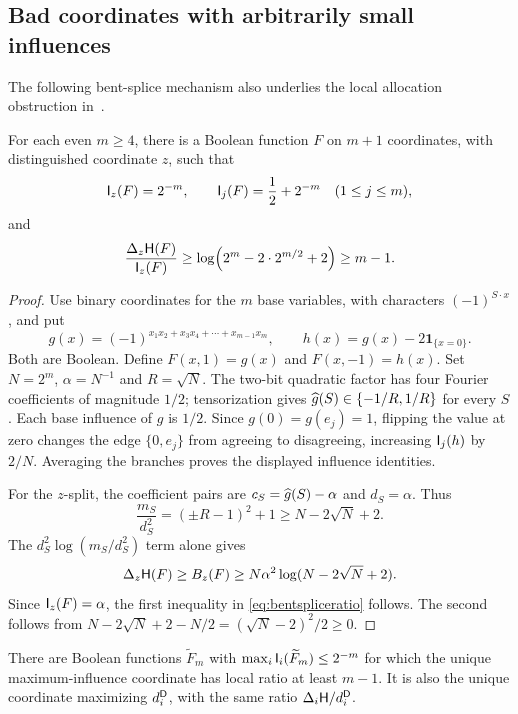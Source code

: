 \subsection{Bad coordinates with arbitrarily small influences}

The following bent-splice mechanism also underlies the local
allocation obstruction in~\cite{BrainAllocation}.

\begin{proposition}\label{prop:bentsplice}
For each even $m\ge4$, there is a Boolean function $F$ on $m+1$
coordinates, with distinguished coordinate $z$, such that
\[
 \mathsf I_z(F)=2^{-m},\qquad
 \mathsf I_j(F)=\frac12+2^{-m}\quad(1\le j\le m),
\]
and
\begin{equation}\label{eq:bentspliceratio}
 \frac{\Delta_z\mathsf H(F)}{\mathsf I_z(F)}
 \ge\log\!\left(2^m-2\cdot2^{m/2}+2\right)\ge m-1.
\end{equation}
\end{proposition}

\begin{proof}
Use binary coordinates for the $m$ base variables, with characters
$(-1)^{S\cdot x}$, and put
\[
 g(x)=(-1)^{x_1x_2+x_3x_4+\cdots+x_{m-1}x_m},\qquad
 h(x)=g(x)-2\mathbf1_{\{x=0\}}.
\]
Both are Boolean. Define $F(x,1)=g(x)$ and $F(x,-1)=h(x)$.
Set $N=2^m$, $\alpha=N^{-1}$ and $R=\sqrt N$.
The two-bit quadratic factor has four Fourier coefficients of
magnitude $1/2$; tensorization gives
$\widehat{g}(S)\in\{-1/R,1/R\}$ for every $S$.
Each base influence of $g$ is $1/2$.
Since $g(0)=g(e_j)=1$, flipping the value at zero changes the
edge $\{0,e_j\}$ from agreeing to disagreeing, increasing
$\mathsf I_j(h)$ by $2/N$. Averaging the branches proves the displayed
influence identities.

For the $z$-split, the coefficient pairs are
$c_S=\widehat{g}(S)-\alpha$ and $d_S=\alpha$. Thus
\[
 \frac{m_S}{d_S^2}=(\pm R-1)^2+1
                   \ge N-2\sqrt N+2.
\]
The $d_S^2\log(m_S/d_S^2)$ term alone gives
\[
 \Delta_z\mathsf H(F)\ge B_z(F)
 \ge N\alpha^2\log(N-2\sqrt N+2).
\]
Since $\mathsf I_z(F)=\alpha$, the first inequality in
\eqref{eq:bentspliceratio} follows. The second follows from
$N-2\sqrt N+2-N/2=(\sqrt N-2)^2/2\ge0$.
\end{proof}

\begin{corollary}\label{cor:badmaximum}
There are Boolean functions $\widetilde F_m$ with
$\max_i\mathsf I_i(\widetilde F_m)\le2^{-m}$ for which the unique
maximum-influence coordinate has local ratio at least $m-1$.
It is also the unique coordinate maximizing $d_i^{\mathsf D}$, with
the same ratio $\Delta_i\mathsf H/d_i^{\mathsf D}$.
\end{corollary}

